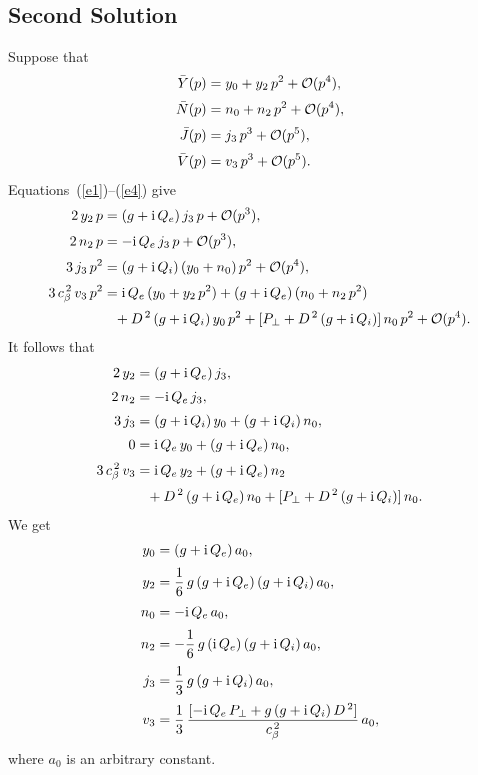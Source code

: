 \documentclass[12pt,prb,aps,notitlepage]{revtex4-1}
\begin{document}
\subsection{Second Solution}
Suppose that 
\begin{align}
\bar{Y}(p) &=y_{0}+ y_2\,p^2+{ \cal O}(p^4),\\[0.5ex]
\bar{N}(p) &= n_{0}+n_2\,p^2+{ \cal O}(p^4),\\[0.5ex]
\bar{J}(p) &= j_3\,p^3+{ \cal O}(p^5),\\[0.5ex]
\bar{V}(p) &= v_3\,p^3+{ \cal O}(p^5).
\end{align}
Equations~(\ref{e1})--(\ref{e4}) give 
\begin{align}
2\, y_2\,p &= (g+{\rm i}\,Q_e)\,j_3\,p + {\cal O}(p^3),\\[0.5ex]
2\, n_2\,p &= -{\rm i}\,Q_e\,j_3\,p+ {\cal O}(p^3),\\[0.5ex]
3\,j_3\,p^2 &= (g+{\rm i}\,Q_i)\,(y_0+n_0)\,p^2+ {\cal O}(p^4),\\[0.5ex]
3\,c_\beta^{\,2}\,v_3\,p^2 &={\rm i}\,Q_e\,(y_{0} +y_2\,p^2) + (g+{\rm i}\,Q_e)\,(n_0+ n_2\,p^2)\nonumber\\[0.5ex]&\phantom{=}
+ D^{\,2}\,(g+{\rm i}\,Q_i)\,y_0\,p^2 + [P_\perp + D^{\,2}\,(g+{\rm i}\,Q_i)]\,n_0\,p^2+ {\cal O}(p^4).
\end{align}
It follows that
\begin{align}
2\,y_2&= (g+{\rm i}\,Q_e)\,j_3,\\[0.5ex]
2\,n_2&= -{\rm i}\,Q_e\,j_3,\\[0.5ex]
3\,j_3&= (g+{\rm i}\,Q_i)\,y_0 + (g+{\rm i}\,Q_i)\,n_0,\\[0.5ex]
0 &= {\rm i}\,Q_e\,y_0 + (g+{\rm i}\,Q_e)\,n_0,\\[0.5ex]
3\,c_\beta^{\,2}\,v_3 &= {\rm i}\,Q_e\,y_2 + (g+{\rm i}\,Q_e)\,n_2 \nonumber\\[0.5ex]
&\phantom{=}+D^{\,2}\,(g+{\rm i}\,Q_e)\,n_0 + [P_\perp + D^{\,2}\,(g+{\rm i}\,Q_i)]\,n_0.
\end{align}
We get
\begin{align}
y_0 &= (g+{\rm i}\,Q_e)\,a_0,\\[0.5ex]
y_2 &= \frac{1}{6}\,g\,(g+{\rm i}\,Q_e)\,(g+{\rm i}\,Q_i)\,a_0,\\[0.5ex]
n_0 &= -{\rm i}\,Q_e\,a_0,\\[0.5ex]
n_2 &= -\frac{1}{6}\,g\,({\rm i}\,Q_e)\,(g+{\rm i}\,Q_i)\,a_0,\\[0.5ex]
j_3 &= \frac{1}{3}\,g\,(g+{\rm i}\,Q_i)\,a_0,\\[0.5ex]
v_3 &= \frac{1}{3}\,\frac{[-{\rm i}\,Q_e\,P_\perp + g\,(g+{\rm i }\,Q_i)\,D^{\,2}]}{c_\beta^{\,2}}\,a_0,
\end{align}
where $a_0$ is an arbitrary constant. 
\end{document}
